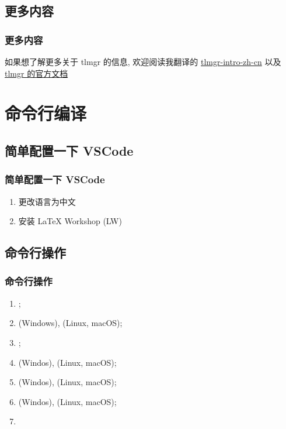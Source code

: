 \subsection{更多内容}

\begin{frame}
  \frametitle{更多内容}
  如果想了解更多关于 tlmgr 的信息, 欢迎阅读我翻译的 \href{http://mirrors.ctan.org/info/tlmgr-intro-zh-cn/tlmgr-intro-zh-cn.pdf}{tlmgr-intro-zh-cn} 以及 \href{https://www.tug.org/texlive/doc/tlmgr.html}{tlmgr 的官方文档}
\end{frame}

\section{命令行编译}

\subsection{简单配置一下 VSCode}

\begin{frame}
  \frametitle{简单配置一下 VSCode}
  \begin{enumerate}[<+->]
    \item 更改语言为中文
    \item 安装 LaTeX Workshop (LW)
  \end{enumerate}
\end{frame}

\subsection{命令行操作}

\begin{frame}[fragile]
  \frametitle{命令行操作}
  \begin{enumerate}[<+->]
    \item {};
    \item {} (Windows),  (Linux, macOS);
    \item {};
    \item {} (Windos),  (Linux, macOS);
    \item {} (Windos),  (Linux, macOS);
    \item {} (Windos),  (Linux, macOS);
    \item {}
  \end{enumerate}
\end{frame}

